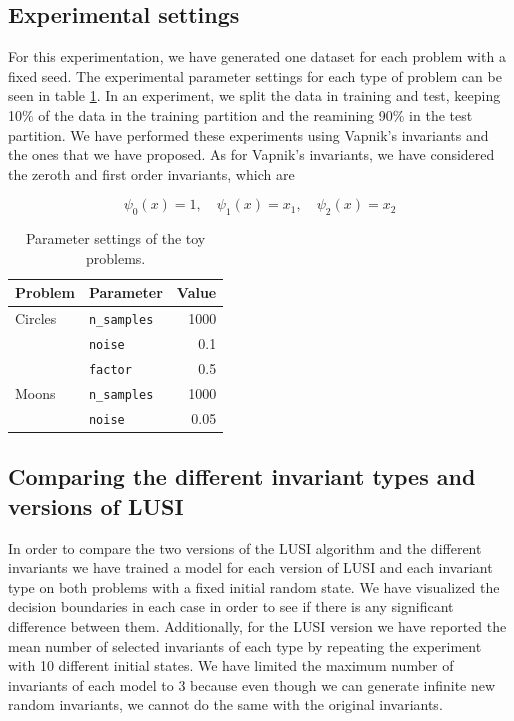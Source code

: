 \subsection{Experimental settings}

For this experimentation, we have generated one dataset for each problem with a fixed seed. The experimental
parameter settings for each type of problem can be seen in table \ref{tab:toy_problems_experiments}. In an experiment,
we split the data in training and test, keeping 10\% of the data in the training partition and the reamining
90\% in the test partition. We have performed these experiments using Vapnik's invariants and the ones
that we have proposed. As for Vapnik's invariants, we have considered the zeroth and first order invariants, which are

\[
    \psi_0(x) = 1,\quad \psi_1(x) = x_1,\quad \psi_2(x) = x_2
\]

\begin{table}[h]
\centering
\begin{tabular}{llr}
\textbf{Problem} & \textbf{Parameter}  & \textbf{Value} \\ \hline
Circles          & \texttt{n\_samples} & 1000           \\
                 & \texttt{noise}      & 0.1            \\
                 & \texttt{factor}     & 0.5            \\
Moons            & \texttt{n\_samples} & 1000           \\
                 & \texttt{noise}      & 0.05          
\end{tabular}
\caption{Parameter settings of the toy problems.}
\label{tab:toy_problems_experiments}
\end{table}

\subsection{Comparing the different invariant types and versions of LUSI}

In order to compare the two versions of the LUSI algorithm and the different invariants
we have trained a model for each version of LUSI and each invariant type on both problems with a fixed
initial random state. We have visualized the decision boundaries in each case in order to see if there is any
significant difference between them. Additionally, for the LUSI version we have reported the mean number of selected
invariants of each type by repeating the experiment with 10 different initial states. We have limited the
maximum number of invariants of each model to 3 because even though we can generate infinite new random
invariants, we cannot do the same with the original invariants.

